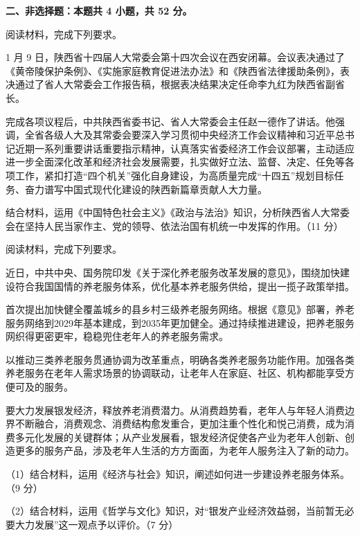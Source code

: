 \documentclass{exam-zh}
\newenvironment{kaiti-indented}{
  \parindent=2em
  \CJKfamily{zhkai}
  \setstretch{1.4}
}{
}
\begin{document}
\begin{flushleft}
  {\bfseries 二、非选择题：本题共 4 小题，共 52 分。}
\end{flushleft}

\begin{question}
  阅读材料，完成下列要求。

  \begin{kaiti-indented}
    1 月 9 日，陕西省十四届人大常委会第十四次会议在西安闭幕。会议表决通过了《黄帝陵保护条例》、《实施家庭教育促进法办法》和《陕西省法律援助条例》，表决通过了省人大常委会工作报告稿，根据表决结果决定任命李九红为陕西省副省长。

    完成各项议程后，中共陕西省委书记、省人大常委会主任赵一德作了讲话。他强调，全省各级人大及其常委会要深入学习贯彻中央经济工作会议精神和习近平总书记近期一系列重要讲话重要指示精神，认真落实省委经济工作会议部署，主动适应进一步全面深化改革和经济社会发展需要，扎实做好立法、监督、决定、任免等各项工作，紧扣打造“四个机关”强化自身建设，为高质量完成“十四五”规划目标任务、奋力谱写中国式现代化建设的陕西新篇章贡献人大力量。
  \end{kaiti-indented}

  结合材料，运用《中国特色社会主义》《政治与法治》知识，分析陕西省人大常委会在坚持人民当家作主、党的领导、依法治国有机统一中发挥的作用。（11 分）
\end{question}
\vspace{-0.5em}

\begin{question}
  阅读材料，完成下列要求。

  \begin{kaiti-indented}
    近日，中共中央、国务院印发《关于深化养老服务改革发展的意见》，围绕加快建设符合我国国情的养老服务体系，优化基本养老服务供给，提出一揽子政策举措。

    首次提出加快健全覆盖城乡的县乡村三级养老服务网络。根据《意见》部署，养老服务网络到2029年基本建成，到2035年更加健全。通过持续推进建设，把养老服务网织得更密更牢，稳稳兜住老年人的养老服务需求。

    以推动三类养老服务贯通协调为改革重点，明确各类养老服务功能作用。加强各类养老服务在老年人需求场景的协调联动，让老年人在家庭、社区、机构都能享受方便可及的服务。

    要大力发展银发经济，释放养老消费潜力。从消费趋势看，老年人与年轻人消费边界不断融合，消费观念、消费结构愈发重合，更加注重个性化和悦己消费，成为消费多元化发展的关键群体；从产业发展看，银发经济促使各产业为老年人创新、创造更多的服务产品，涉及老年人生活的方方面面，为老年人服务注入了新的动力。
  \end{kaiti-indented}

  （1）结合材料，运用《经济与社会》知识，阐述如何进一步建设养老服务体系。（9 分）

  （2）结合材料，运用《哲学与文化》知识，对“银发产业经济效益弱，当前暂无必要大力发展”这一观点予以评价。（7 分）
\end{question}
\vspace{-0.5em}
\end{document}
